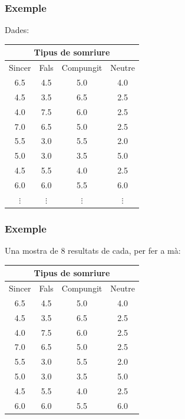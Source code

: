 \documentclass[12pt,t]{beamer}
\theoremstyle{plain}
\theoremstyle{definition}
\begin{document}
\begin{frame}
\frametitle{Exemple}

Dades: 
\begin{center}
\begin{tabular}{cccc}
\multicolumn{4}{c}{Tipus de somriure}\\\hline
Sincer & Fals & Compungit & Neutre\\\hline
6.5 &4.5 &  5.0  &  4.0 \\
4.5 &3.5 & 6.5  &  2.5  \\
4.0 &7.5 & 6.0  &  2.5  \\
7.0  &6.5 & 5.0  &  2.5  \\
5.5 & 3.0 & 5.5  & 2.0  \\
5.0  &3.0 & 3.5  &  5.0  \\
4.5  &5.5 & 4.0  & 2.5  \\
6.0 & 6.0 &5.5  &6.0    \\
$\vdots$ & $\vdots$ & $\vdots$ & $\vdots$ 
\end{tabular}
\end{center}


\end{frame}


\begin{frame}
\frametitle{Exemple}

Una mostra de 8 resultats de cada, per fer a mà:
\begin{center}
\begin{tabular}{cccc}
\multicolumn{4}{c}{Tipus de somriure}\\\hline
Sincer & Fals & Compungit & Neutre\\\hline
6.5 &4.5 &  5.0  &  4.0 \\
4.5 &3.5 & 6.5  &  2.5  \\
4.0 &7.5 & 6.0  &  2.5  \\
7.0  &6.5 & 5.0  &  2.5  \\
5.5 & 3.0 & 5.5  & 2.0  \\
5.0  &3.0 & 3.5  &  5.0  \\
4.5  &5.5 & 4.0  & 2.5  \\
6.0 & 6.0 &5.5  &6.0   
\end{tabular}
\end{center}
\end{frame}
\end{document}
